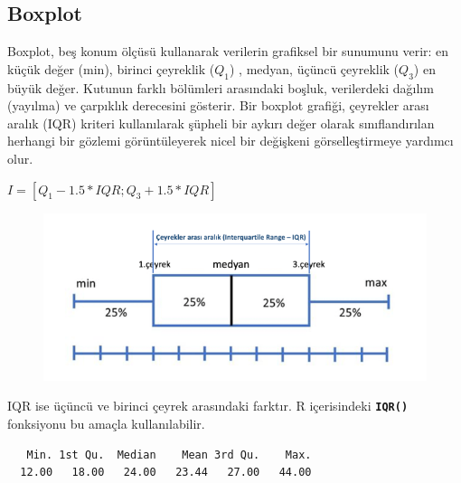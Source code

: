 \documentclass[
  letterpaper,
  DIV=11,
  numbers=noendperiod]{scrreprt}
\newenvironment{Shaded}{\begin{snugshade}}{\end{snugshade}}
\newcommand{\CommentTok}[1]{\textcolor[rgb]{0.37,0.37,0.37}{#1}}
\newcommand{\FunctionTok}[1]{\textcolor[rgb]{0.28,0.35,0.67}{#1}}
\newcommand{\NormalTok}[1]{\textcolor[rgb]{0.00,0.23,0.31}{#1}}
\newcommand{\SpecialCharTok}[1]{\textcolor[rgb]{0.37,0.37,0.37}{#1}}
\begin{document}
\hypertarget{boxplot}{%
\subsection*{Boxplot}\label{boxplot}}

Boxplot, beş konum ölçüsü kullanarak verilerin grafiksel bir sunumunu
verir: en küçük değer (min), birinci çeyreklik (\(Q_1\)) , medyan,
üçüncü çeyreklik (\(Q_3\)) en büyük değer. Kutunun farklı bölümleri
arasındaki boşluk, verilerdeki dağılım (yayılma) ve çarpıklık derecesini
gösterir. Bir boxplot grafiği, çeyrekler arası aralık (IQR) kriteri
kullanılarak şüpheli bir aykırı değer olarak sınıflandırılan herhangi
bir gözlemi görüntüleyerek nicel bir değişkeni görselleştirmeye yardımcı
olur.

\(I = [Q_1-1.5 * IQR ; Q_3 + 1.5 * IQR]\)

\begin{figure}

{\centering \includegraphics{images/boxplot.png}

}

\end{figure}

IQR ise üçüncü ve birinci çeyrek arasındaki farktır. R içerisindeki
\textbf{\texttt{IQR()}} fonksiyonu bu amaçla kullanılabilir.

\begin{Shaded}
\end{Shaded}

\begin{verbatim}
   Min. 1st Qu.  Median    Mean 3rd Qu.    Max. 
  12.00   18.00   24.00   23.44   27.00   44.00 
\end{verbatim}
\end{document}
